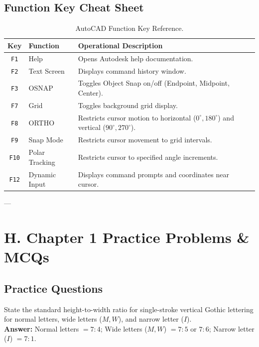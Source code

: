 \subsection{Function Key Cheat Sheet}
\begin{table}[htbp]
\centering
\small
\begin{tabularx}{\textwidth}{c l X}
\toprule
\textbf{Key} & \textbf{Function} & \textbf{Operational Description} \\
\midrule
\texttt{F1} & Help & Opens Autodesk help documentation. \\
\texttt{F2} & Text Screen & Displays command history window. \\
\texttt{F3} & OSNAP & Toggles Object Snap on/off (Endpoint, Midpoint, Center). \\
\texttt{F7} & Grid & Toggles background grid display. \\
\texttt{F8} & ORTHO & Restricts cursor motion to horizontal ($0^\circ, 180^\circ$) and vertical ($90^\circ, 270^\circ$). \\
\texttt{F9} & Snap Mode & Restricts cursor movement to grid intervals. \\
\texttt{F10} & Polar Tracking & Restricts cursor to specified angle increments. \\
\texttt{F12} & Dynamic Input & Displays command prompts and coordinates near cursor. \\
\bottomrule
\end{tabularx}
\caption{AutoCAD Function Key Reference.}
\label{tab:function-keys}
\end{table}

---

\section{H. Chapter 1 Practice Problems \& MCQs}

\subsection{Practice Questions}

\begin{vivaqa}
State the standard height-to-width ratio for single-stroke vertical Gothic lettering for normal letters, wide letters ($M, W$), and narrow letter ($I$).\\[4pt]
\textbf{Answer:} Normal letters $= 7:4$; Wide letters ($M, W$) $= 7:5$ or $7:6$; Narrow letter ($I$) $= 7:1$.
\end{vivaqa}

